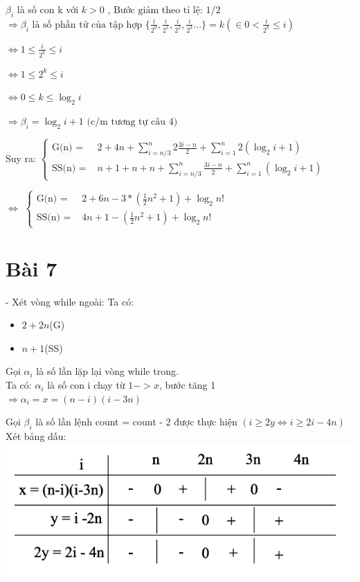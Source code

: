 \documentclass{article}
\newcommand\tab[1][1cm]{\hspace*{#1}}
\begin{document}
\tab $\beta_{i}$ là số con k với $k > 0 $ , \(\text{Bước giảm theo tỉ lệ: } 1/2\)\\


\(\Rightarrow  \beta_{i} \text{ là số phần tử của tập hợp } \{ \frac{i}{2^0}, \frac{i}{2^1},  \frac{i}{2^2},  \frac{i}{2^3}... \}
= k (\in 0 < \frac{i}{2^k} \leq i)\) 
\vspace{5mm}

\(\Leftrightarrow  1 \leq  \frac{i}{2^k} \leq  i\)

\vspace{2mm}
\(\Leftrightarrow  1 \leq  2^k \leq  i\)

\vspace{2mm}
\(\Leftrightarrow  0 \leq k \leq  \log_{2}{i} \) 

\(\Rightarrow  \beta_{i} = \log_{2}{i} + 1 \text{ (c/m tương tự câu 4)}\) 
\vspace{10mm}

\tab Suy ra:
\(
\begin{cases}
    \text{G(n) = } & 2 + 4n +  \sum\limits_{i=n/3}^{n}2\frac{3i-n}{2} + \sum\limits_{i=1}^{n}2(\log_{2}{i} + 1) \\
    \text{SS(n) = } &  n + 1 + n + n + \sum\limits_{i=n/3}^{n}\frac{3i-n}{2} + \sum\limits_{i=1}^{n}(\log_{2}{i} + 1)
\end{cases}
\)

\tab $\Leftrightarrow $
\(
\begin{cases}
    \text{G(n) = } & 2 + 6n -  3*(\frac{1}{2}n^2 + 1) + \log_{2}{n!} \\
    \text{SS(n) = } &  4n + 1  - (\frac{1}{2}n^2 + 1) + \log_{2}{n!} 
\end{cases}
\)

\newpage

\section*{Bài 7}
- Xét vòng while ngoài:
Ta có:
\begin{itemize}
    \item $ 2+2n $(G)
    \item $ n + 1 $(SS)
\end{itemize}

Gọi $\alpha_{i}$ là số lần lặp lại vòng while trong.\\
Ta có: $\alpha_{i}$ là số con i chạy từ $ 1 -> x$, bước tăng 1 \\
\(\Rightarrow \alpha_{i} = x = (n-i)(i-3n) \)

Gọi $\beta_{i}$ là số lần lệnh count = count - 2 được thực hiện \((i \geq 2y \Leftrightarrow i \geq 2i - 4n )\)\\
Xét bảng dấu:\\
\includegraphics[scale=0.7]{BT/bangbai7}
\end{document}
